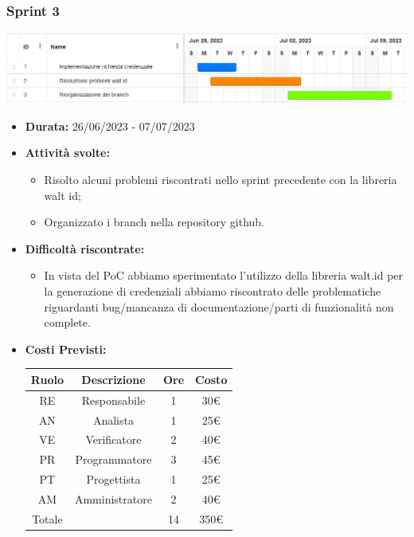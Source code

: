 \subsubsection{Sprint 3}
\begin{center}
    \includegraphics[scale = 0.5]{./res/img/Sprint_3.png}
  \end{center}
\begin{itemize}
    \item \textbf{Durata:} 26/06/2023 - 07/07/2023 
    \newpage
    \item \textbf{Attività svolte:}
    \begin{itemize}
        \item Risolto alcuni problemi riscontrati nello sprint precedente con la libreria walt id;
        \item Organizzato i branch nella repository github.
    \end{itemize}
    \item \textbf{Difficoltà riscontrate:}
    \begin{itemize}
        \item In vista del PoC abbiamo sperimentato l’utilizzo della libreria walt.id per la generazione di credenziali
        abbiamo riscontrato delle problematiche riguardanti bug/mancanza di documentazione/parti di funzionalità non complete.
    \end{itemize}
    \item \textbf{Costi Previsti:}
    \begin{longtable}{|c|c|c|c|}
        \hline
        Ruolo & Descrizione & Ore & Costo \\
        \hline
        RE & Responsabile & 1 & 30€ \\
        \hline
        AN & Analista & 1 & 25€ \\
        \hline
        VE & Verificatore & 2 & 40€ \\
        \hline
        PR & Programmatore & 3 & 45€ \\
        \hline
        PT & Progettista & 1 & 25€ \\
        \hline
        AM & Amministratore & 2 & 40€ \\
        \hline
        Totale & & 14 & 350€ \\
        \hline
        \end{longtable}
        

\end{itemize}
